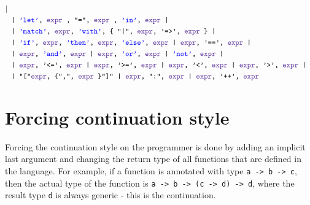 \documentclass{article}
\begin{document}
\begin{align*}
{		|}\\
	&\texttt{
		| \color{blue}'let'\color{black}, 
		\color{RoyalPurple}expr \color{black}, "=",	\color{RoyalPurple}expr \color{black},	 \color{blue}'in'\color{black}, \color{RoyalPurple}expr \color{black} 
		|}\\
	&\texttt{
		| \color{blue}'match'\color{black}, \color{RoyalPurple}expr\color{black}, \color{blue}'with'\color{black}, \{ "|", \color{RoyalPurple}expr\color{black}, '=>', \color{RoyalPurple}expr \color{black} \}
		|}\\
	&\texttt{
		| \color{blue}'if'\color{black}, \color{RoyalPurple}expr\color{black}, \color{blue}'then'\color{black}, \color{RoyalPurple}expr\color{black}, \color{blue}'else'\color{black}, \color{RoyalPurple}expr \color{black}
		| \color{RoyalPurple}expr\color{black}, '==',
		\color{RoyalPurple}expr \color{black}
		|}\\
	&\texttt{
		| \color{RoyalPurple}expr\color{black}, \color{blue}'and'\color{black}, \color{RoyalPurple}expr \color{black}
		| \color{RoyalPurple}expr\color{black}, \color{blue} 'or'\color{black}, \color{RoyalPurple}expr \color{black}
		| \color{blue} 'not'\color{black}, \color{RoyalPurple}expr \color{black} 
		|}\\
	&\texttt{
		| \color{RoyalPurple}expr\color{black}, '<=', \color{RoyalPurple}expr \color{black}
		| \color{RoyalPurple}expr\color{black}, '>=', \color{RoyalPurple}expr \color{black}
		| \color{RoyalPurple}expr\color{black}, '<', \color{RoyalPurple}expr \color{black}
		| \color{RoyalPurple}expr\color{black}, '>', \color{RoyalPurple}expr \color{black}
		|}\\
	&\texttt{
		| "["\color{RoyalPurple}expr\color{black}, \{",", \color{RoyalPurple}expr \color{black}\}"]"
		| \color{RoyalPurple} expr\color{black}, ":", \color{RoyalPurple}expr \color{black}
		| \color{RoyalPurple}expr\color{black}, '++', \color{RoyalPurple}expr \color{black}
	}
	\end{align*}
	\section{Forcing continuation style}
	Forcing the continuation style on the programmer is done by adding an implicit last argument
	and changing the return type of all functions that are defined in the language.
	For example, if a function is annotated with type \texttt{a -> b -> c},
	then the actual type of the function is \texttt{a -> b -> (c -> d) -> d},
	where the result type \texttt{d} is always generic - this is the continuation.
\end{document}
